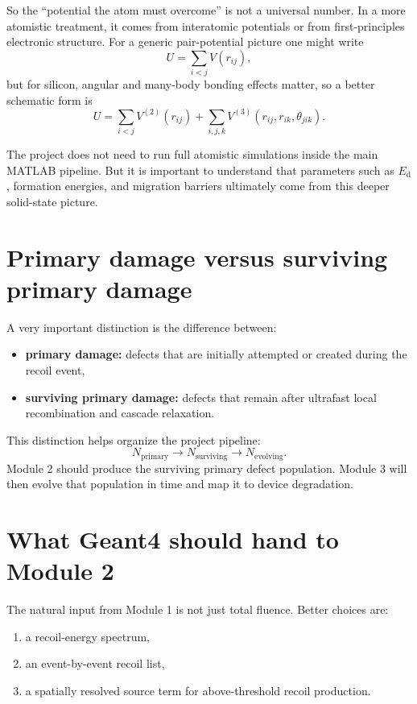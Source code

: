 \documentclass[11pt]{article}
\newcommand{\Ed}{E_{\mathrm d}}
\begin{document}
So the ``potential the atom must overcome'' is not a universal number. In a more atomistic treatment, it comes from interatomic potentials or from first-principles electronic structure. For a generic pair-potential picture one might write
\begin{equation}
U = \sum_{i<j} V(r_{ij}),
\end{equation}
but for silicon, angular and many-body bonding effects matter, so a better schematic form is
\begin{equation}
U = \sum_{i<j} V^{(2)}(r_{ij}) + \sum_{i,j,k} V^{(3)}(r_{ij},r_{ik},\theta_{jik}).
\end{equation}

The project does not need to run full atomistic simulations inside the main MATLAB pipeline. But it is important to understand that parameters such as $\Ed$, formation energies, and migration barriers ultimately come from this deeper solid-state picture.

\section{Primary damage versus surviving primary damage}

A very important distinction is the difference between:
\begin{itemize}
    \item \textbf{primary damage:} defects that are initially attempted or created during the recoil event,
    \item \textbf{surviving primary damage:} defects that remain after ultrafast local recombination and cascade relaxation.
\end{itemize}

This distinction helps organize the project pipeline:
\begin{equation}
N_{\mathrm{primary}} \rightarrow N_{\mathrm{surviving}} \rightarrow N_{\mathrm{evolving}}.
\end{equation}
Module 2 should produce the surviving primary defect population. Module 3 will then evolve that population in time and map it to device degradation.

\section{What Geant4 should hand to Module 2}

The natural input from Module 1 is not just total fluence. Better choices are:
\begin{enumerate}[label=\arabic*.]
    \item a recoil-energy spectrum,
    \item an event-by-event recoil list,
    \item a spatially resolved source term for above-threshold recoil production.
\end{enumerate}
\end{document}
